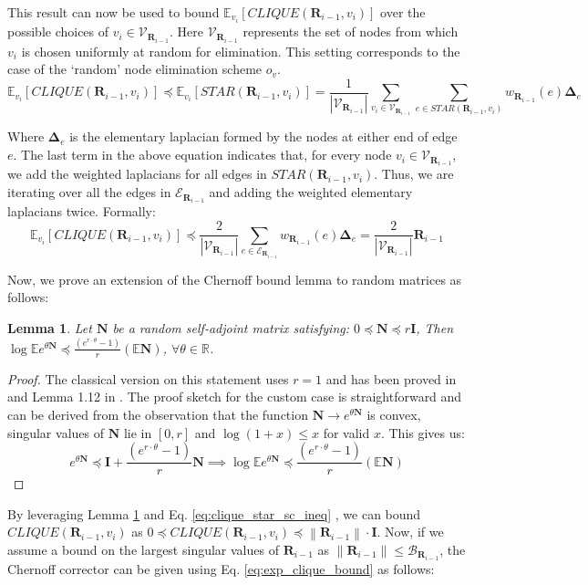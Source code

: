 \documentclass{article}
\newcommand{\norm}[1]{\left\lVert#1\right\rVert}
\def\mI{{\mathbf{I}}}
\def\mN{{\mathbf{N}}}
\def\mR{{\mathbf{R}}}
\def\gE{{\mathcal{E}}}
\def\gV{{\mathcal{V}}}
\theoremstyle{plain}
\newtheorem{lemma}[theorem]{Lemma}
\theoremstyle{definition}
\theoremstyle{remark}
\begin{document}
This result can now be used to bound $\mathbb{E}_{v_i}[\textit{CLIQUE}(\mR_{i-1}, v_i)]$ over the possible choices of $v_i \in \gV_{\mR_{i-1}}$. Here $\gV_{\mR_{i-1}}$ represents the set of nodes from which $v_i$ is chosen uniformly at random for elimination. This setting corresponds to the case of the `random' node elimination scheme $o_v$.
\begin{equation}
\mathbb{E}_{v_i}[\textit{CLIQUE}(\mR_{i-1}, v_i)] \preccurlyeq \mathbb{E}_{v_i}[\textit{STAR}(\mR_{i-1}, v_i)] = \frac{1}{|\gV_{\mR_{i-1}}|} \sum_{v_i \in \gV_{\mR_{i-1}}} \sum_{e \in \textit{STAR}(\mR_{i-1}, v_i)}w_{\mR_{i-1}}(e)\mathbf{\Delta}_e
\end{equation}

Where $\mathbf{\Delta}_e$ is the elementary laplacian formed by the nodes at either end of edge $e$. The last term in the above equation indicates that, for every node $v_i \in \gV_{\mR_{i-1}}$, we add the weighted laplacians for all edges in $\textit{STAR}(\mR_{i-1}, v_i)$. Thus, we are iterating over all the edges in $\gE_{\mR_{i-1}}$ and adding the weighted elementary laplacians twice. Formally:
\begin{equation}
\label{eq:exp_clique_bound}
\mathbb{E}_{v_i}[\textit{CLIQUE}(\mR_{i-1}, v_i)] \preccurlyeq \frac{2}{|\gV_{\mR_{i-1}}|} \sum_{e \in \gE_{\mR_{i-1}}} w_{\mR_{i-1}}(e)\mathbf{\Delta}_e = \frac{2}{|\gV_{\mR_{i-1}}|} \mR_{i-1}
\end{equation}

Now, we prove an extension of the Chernoff bound lemma to random matrices as follows:

\begin{lemma}
\label{lemma:extended_chernoff}
Let $\mN$ be a random self-adjoint matrix satisfying: $0 \preccurlyeq \mN \preccurlyeq r\mI$, Then $\log \mathbb{E}e^{\theta \mN} \preccurlyeq \frac{(e^{r\cdot \theta} - 1)}{r}(\mathbb{E}\mN)$, $\forall \theta \in \mathbb{R}$.
\end{lemma}
\begin{proof}
The classical version on this statement uses $r = 1$ and has been proved in \citet{tropp2012user} and Lemma 1.12 in \citet{tropp2019matrix}. The proof sketch for the custom case is straightforward and can be derived from the observation that the function $\mN \rightarrow e^{\theta \mN}$ is convex, singular values of $\mN$ lie in $[0, r]$ and $\log(1+x) \le x$ for valid $x$. This gives us:
\begin{equation*}
    e^{\theta \mN} \preccurlyeq \mI + \frac{(e^{r \cdot \theta} - 1)}{r}\mN 
    \implies \log \mathbb{E} e^{\theta \mN} \preccurlyeq \frac{(e^{r \cdot \theta} - 1)}{r}(\mathbb{E}\mN)
\end{equation*}
\end{proof}
By leveraging Lemma \ref{lemma:extended_chernoff} and Eq. \ref{eq:clique_star_sc_ineq} , we can bound $\textit{CLIQUE}(\mR_{i-1}, v_i)$ as $0 \preccurlyeq \textit{CLIQUE}(\mR_{i-1}, v_i) \preccurlyeq \norm{\mR_{i-1}}\cdot \mI$. Now, if we assume a bound on the largest singular values of $\mR_{i-1}$ as $\norm{\mR_{i-1}} \le \mathcal{B}_{\mR_{i-1}}$, the Chernoff corrector can be given using Eq. \ref{eq:exp_clique_bound} as follows:
\end{document}
